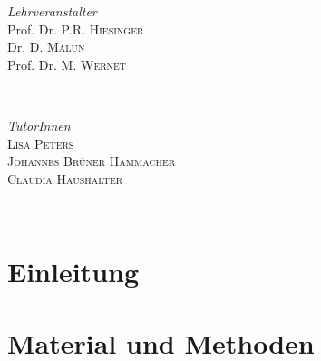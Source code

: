 \documentclass[11pt]{article}
\begin{document}
\begin{titlepage}
\vfill

	\begin{minipage}{0.45\textwidth}
		\begin{flushleft}
			\large
			\textit{Lehrveranstalter}\\
			Prof. Dr. P.R. \textsc{Hiesinger}\\ 
			Dr. D. \textsc{Malun}\\ 
			Prof. Dr. M. \textsc{Wernet}
		\end{flushleft}
	\end{minipage}
	~
		\begin{minipage}{0.45\textwidth}
		\begin{flushright}
			
		\end{flushright}
	\end{minipage}
\vfill
	\begin{minipage}{0.7\textwidth}
		\begin{flushleft}
			\large
			\textit{TutorInnen}\\
			\textsc{Lisa Peters}\\
			\textsc{Johannes Brüner Hammacher}\\
			\textsc{Claudia Haushalter}
		\end{flushleft}
	\end{minipage}
	~
		\begin{minipage}{0.2\textwidth}
		\begin{flushright}
			
		\end{flushright}
	\end{minipage}

	\vfill\vfill\vfill %

	
	\vfill %
	
\end{titlepage}

\section{Einleitung}

\section{Material und Methoden}
\end{document}
